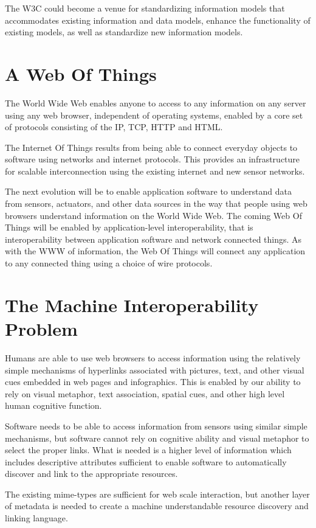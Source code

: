 \documentclass[journal]{IEEEtran}
\begin{document}
The W3C could become a venue for standardizing information models that accommodates existing information and data models, enhance the functionality of existing models, as well as standardize new information models. 


\section{A Web Of Things}

The World Wide Web enables anyone to access to any information on any server using any web browser, independent of operating systems, enabled by a core set of protocols consisting of the IP, TCP, HTTP and HTML. 

The Internet Of Things results from being able to connect everyday objects to software using networks and internet protocols. This provides an infrastructure for scalable interconnection using the existing internet and new sensor networks. 

The next evolution will be to enable application software to understand data from sensors, actuators, and other data sources in the way that people using web browsers understand information on the World Wide Web. The coming Web Of Things will be enabled by application-level interoperability, that is interoperability between application software and network connected things. As with the WWW of information, the Web Of Things will connect any application to any connected thing using a choice of wire protocols.

\section{The Machine Interoperability Problem}
Humans are able to use web browsers to access information using the relatively simple mechanisms of hyperlinks associated with pictures, text, and other visual cues embedded in web pages and infographics. This is enabled by our ability to rely on visual metaphor, text association, spatial cues, and other high level human cognitive function.

Software needs to be able to access information from sensors using similar simple mechanisms, but software cannot rely on cognitive ability and visual metaphor to select the proper links. What is needed is a higher level of information which includes descriptive attributes sufficient to enable software to automatically discover and link to the appropriate resources.

The existing mime-types are sufficient for web scale interaction, but another layer of metadata is needed to create a machine understandable resource discovery and linking language.
\end{document}
